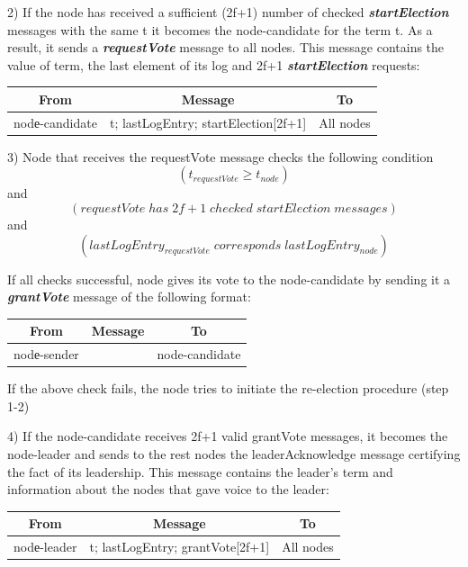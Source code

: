 \documentclass[12pt, a5paper]{article}
\begin{document}
2) If the node has received a sufficient (2f+1) number of checked \textbf{\textit{startElection}} messages with the same t it becomes the node-candidate for the term t. As a result, it sends a \textbf{\textit{requestVote}} message to all nodes. This message contains the value of term, the last element of its log and 2f+1 \textbf{\textit{startElection}} requests:

\begin{table}[h!]
\begin{center}
\begin{tabular}{|c|c|c|}
\hline
From &  Message & To \\
\hline
\small{nodе-candidate} &\footnotesize{t; lastLogEntry; startElection[2f+1]}& \small{All nodes}\\
\hline
\end{tabular}
\end{center}
\end{table} 

3) Node that receives the requestVote message checks the following condition
$$(t_{requestVote} \ge t_{node})$$
and 
$$(requestVote\; has\; 2f+1\; checked\; startElection\;  messages)$$ 
and 
$$(lastLogEntry_{requestVote}\; corresponds\; lastLogEntry_{node})$$
 
If all checks successful, node gives its vote to the node-candidate by sending it a \textbf{\textit{grantVote}} message of the following format:
\begin{table}[h!]
\begin{center}
\begin{tabular}{|c|c|c|}
\hline
From &  Message & To \\
\hline
\small{nodе-sender} & & \small{node-candidate}\\
\hline
\end{tabular}
\end{center}
\end{table} 

If the above check fails, the node tries to initiate the re-election procedure (step 1-2)

4) If the node-candidate receives 2f+1 valid grantVote messages, it becomes the node-leader and sends to the rest nodes the leaderAcknowledge message certifying the fact of its leadership. This message contains the leader's term and information about the nodes that gave voice to the leader:

\begin{table}[h!]
\begin{center}
\begin{tabular}{|c|c|c|}
\hline
From &  Message & To \\
\hline
\small{nodе-leader} &\footnotesize{t; lastLogEntry; grantVote[2f+1]} & \small{All nodes}\\
\hline
\end{tabular}
\end{center}
\end{table} 
\end{document}
